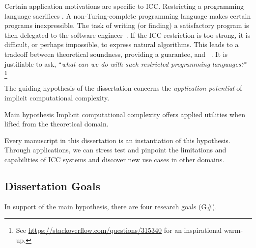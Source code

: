 Certain application motivations are specific to ICC\@.
Restricting a programming language sacrifices .
A non-Turing-complete programming language makes certain programs inexpressible.
The task of writing (or finding) a satisfactory program is then delegated to the software engineer~\cite[p. 14]{moyen2017}.
If the ICC restriction is too strong, it is difficult, or perhaps impossible, to express natural algorithms.
This leads to a tradeoff between theoretical soundness, \ie providing a guarantee, and ~\cite{feree2018}.
It is justifiable to ask, \enquote{\emph{what can we do with such restricted programming languages?}}%
\footnote{See \url{https://stackoverflow.com/questions/315340} for an inspirational warm-up.}

The guiding hypothesis of the dissertation concerns the \emph{application
potential} of implicit computational complexity.
\begin{infobox}[]{Main hypothesis}
Implicit computational complexity offers applied utilities when lifted from the
theoretical domain.
\end{infobox}

\noindent
Every manuscript in this dissertation is an instantiation of this hypothesis.
Through applications, we can stress test and pinpoint the limitations and
capabilities of ICC systems and discover new use cases in other domains.

\subsection{Dissertation Goals}\label{subsec:specific-aims}

In support of the main hypothesis, there are four research goals (G\#).

